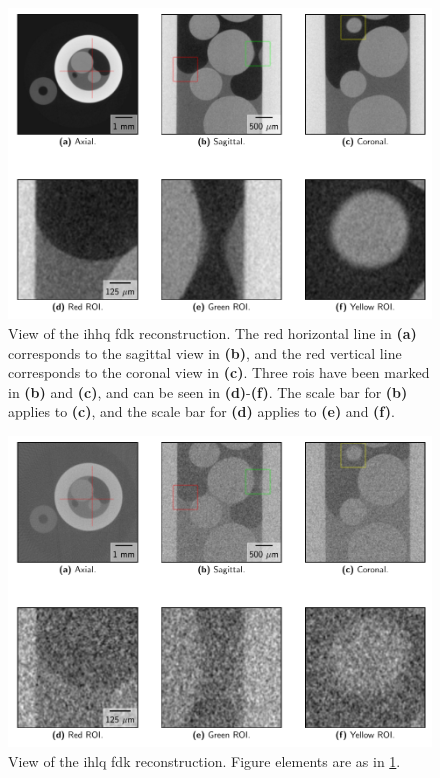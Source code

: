 
\begin{figure}[htbp]
  \centering
  \includegraphics[width=.9\textwidth]{figures/kimroberthq-x475y620s250.pdf}
  \caption[View of IHHQ]{View of the \acrshort{ihhq} \acrshort{fdk} reconstruction. The red horizontal line in \textbf{(a)} corresponds to the sagittal view in \textbf{(b)}, and the red vertical line corresponds to the coronal view in \textbf{(c)}. Three \acrshort{roi}s have been marked in \textbf{(b)} and \textbf{(c)}, and can be seen in \textbf{(d)}-\textbf{(f)}. The scale bar for \textbf{(b)} applies to \textbf{(c)}, and the scale bar for \textbf{(d)} applies to \textbf{(e)} and \textbf{(f)}. }
  \label{fig:sideplothq}
\end{figure}

\begin{figure}[htbp]
  \centering
  \includegraphics[width=.9\textwidth]{figures/kimrobertfdk-x475y620s250.pdf}
  \caption[View of IHLQ FDK]{View of the \acrshort{ihlq} \acrshort{fdk} reconstruction. Figure elements are as in \cref{fig:sideplothq}.} 
  \label{fig:sideplotfdk}
\end{figure}

